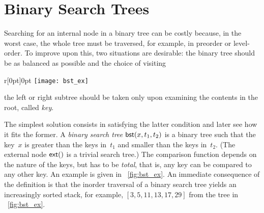 \chapter{Binary Search Trees}

Searching for an internal node in a binary tree can be costly because,
in the worst case, the whole tree must be traversed, for example, in
preorder or level\hyp{}order. To improve upon this, two situations are
desirable: the binary tree should be as balanced as possible and the choice of visiting
\begin{wrapfigure}[7]{r}[0pt]{0pt}
\centering
\texttt{[image: bst\_ex]}
\caption{\label{fig:bst_ex}}
\end{wrapfigure}
the left or right subtree should be taken only upon examining the
contents in the root, called \emph{key}.

The simplest solution consists in satisfying the latter condition and
later see how it fits the former. A \emph{binary search tree}
\citep{Mahmoud_1992} \(\textsf{bst}(x, t_1,
t_2)\) is a binary tree such that the key~\(x\)
is greater than the keys in~\(t_1\) and smaller than the keys
in~\(t_2\). (The external node \(\textsf{ext}()\) is a trivial search
tree.) The comparison function depends on the nature of the keys, but
has to be \emph{total}, that is, any key can be compared to any other
key. An example is given in \fig~\vref{fig:bst_ex}. An immediate
consequence of the definition is that the inorder traversal of a binary search tree yields an
increasingly sorted stack, for example, \([3,5,11,13,17,29]\) from the
tree in \fig~\ref{fig:bst_ex}.

